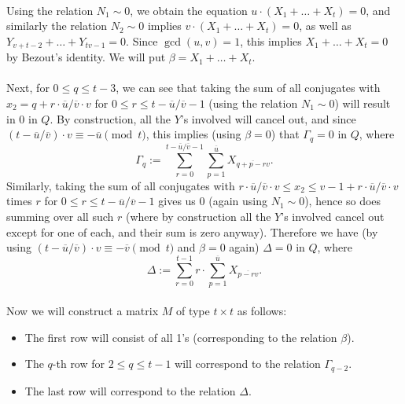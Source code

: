 \documentclass[12pt,a4paper]{article}
\newcommand{\uo}{\overline{u}}
\newcommand{\vo}{\overline{v}}
\begin{document}
\paragraph*{}
Using the relation $N_1\sim 0$, we obtain the equation $u\cdot (X_1+\dots+X_t)=0$, and similarly the relation $N_2\sim 0$ implies $v\cdot (X_1+\dots+X_t)=0$, as well as $Y_{v+t-2}+\dots+Y_{tv-1}=0$. Since $\gcd(u,v)=1$, this implies $X_1+\dots+X_t=0$ by Bezout's identity. We will put $\beta=X_1+\dots+X_t$.
\paragraph*{}
Next, for $0\leq q \leq t-3$, we can see that taking the sum of all conjugates with $x_2=q+r\cdot \uo/\vo\cdot v$ for $0\leq r\leq t-\uo/\vo-1$ (using the relation $N_1\sim 0$) will result in $0$ in $Q$. By construction, all the $Y$'s involved will cancel out, and since $(t-\uo/\vo)\cdot v\equiv -\uo \pmod{t}$, this implies (using $\beta=0$) that $\Gamma_q=0$ in $Q$, where
$$\Gamma_q:=\sum_{r=0}^{t-\uo/\vo-1}\sum_{p=1}^{\uo}X_{\overline{q+p-rv}}.$$
Similarly, taking the sum of all conjugates with $r\cdot \uo/\vo\cdot v\leq x_2\leq v-1+r\cdot \uo/\vo\cdot v$ times $r$ for $0\leq r\leq t-\uo/\vo-1$ gives us $0$ (again using $N_1\sim 0$), hence so does summing over all such $r$ (where by construction all the $Y$'s involved cancel out except for one of each, and their sum is zero anyway). Therefore we have (by using $(t-\uo/\vo)\cdot v\equiv -\vo \pmod{t}$ and $\beta=0$ again) $\Delta=0$ in $Q$, where
$$\Delta:=\sum_{r=0}^{t-1}r\cdot\sum_{p=1}^{\uo}X_{\overline{p-rv}}.$$
\paragraph*{}
Now we will construct a matrix $M$ of type $t\times t$ as follows:
\begin{itemize}
\item The first row will consist of all 1's (corresponding to the relation $\beta$).
\item The $q$-th row for $2\leq q\leq t-1$ will correspond to the relation $\Gamma_{q-2}$.
\item The last row will correspond to the relation $\Delta$.
\end{itemize}
\end{document}
